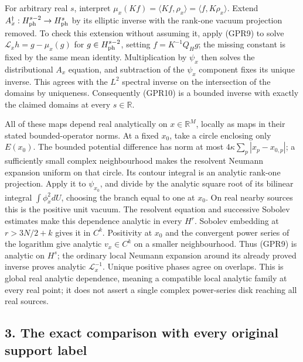 \documentclass[11pt]{article}
\begin{document}
For arbitrary real \(s\), interpret \(\mu_x(Kf)=\langle Kf,\rho_x\rangle=\langle f,K\rho_x\rangle\). Extend \(A_x^\dagger:H^{s-2}_{\rm ph}\to H^s_{\rm ph}\) by its elliptic inverse with the rank-one vacuum projection removed. To check this extension without assuming it, apply (GPR9) to solve \(\mathcal L_xh=g-\mu_x(g)\) for \(g\in H^{s-2}_{\rm ph}\), setting \(f=K^{-1}Q_Hg\); the missing constant is fixed by the same mean identity. Multiplication by \(\psi_x\) then solves the distributional \(A_x\) equation, and subtraction of the \(\psi_x\) component fixes its unique inverse. This agrees with the \(L^2\) spectral inverse on the intersection of the domains by uniqueness. Consequently (GPR10) is a bounded inverse with exactly the claimed domains at every \(s\in\mathbb R\).

All of these maps depend real analytically on \(x\in\mathbb R^M\), locally as maps in their stated bounded-operator norms. At a fixed \(x_0\), take a circle enclosing only \(E(x_0)\). The bounded potential difference has norm at most \(4\kappa\sum_p|x_p-x_{0,p}|\); a sufficiently small complex neighbourhood makes the resolvent Neumann expansion uniform on that circle. Its contour integral is an analytic rank-one projection. Apply it to \(\psi_{x_0}\), and divide by the analytic square root of its bilinear integral \(\int\phi_x^2dU\), choosing the branch equal to one at \(x_0\). On real nearby sources this is the positive unit vacuum. The resolvent equation and successive Sobolev estimates make this dependence analytic in every \(H^r\). Sobolev embedding at \(r>3N/2+k\) gives it in \(C^k\). Positivity at \(x_0\) and the convergent power series of the logarithm give analytic \(v_x\in C^k\) on a smaller neighbourhood. Thus (GPR9) is analytic on \(H^s\); the ordinary local Neumann expansion around its already proved inverse proves analytic \(\mathscr L_x^{-1}\). Unique positive phases agree on overlaps. This is global real analytic dependence, meaning a compatible local analytic family at every real point; it does not assert a single complex power-series disk reaching all real sources.

\subsection*{3. The exact comparison with every original support label}
\end{document}
